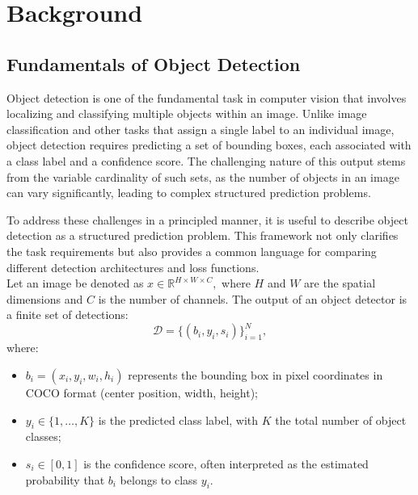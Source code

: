 \chapter{Background}
\label{ch:object-detection}
\section{Fundamentals of Object Detection}

Object detection is one of the fundamental task in computer vision that involves localizing and classifying multiple objects within an image. Unlike image classification and other tasks that assign a single label to an individual image, object detection requires predicting a set of bounding boxes, each associated with a class label and a confidence score. The challenging nature of this output stems from the variable cardinality of such sets, as the number of objects in an image can vary significantly, leading to complex structured prediction problems.

To address these challenges in a principled manner, it is useful to describe object detection as a structured prediction problem. This framework not only clarifies the task requirements but also provides a common language for comparing different detection architectures and loss functions.\\

Let an image be denoted as 
$
x \in \mathbb{R}^{H \times W \times C},
$
where $H$ and $W$ are the spatial dimensions and $C$ is the number of channels.
The output of an object detector is a finite set of detections:
$$
\mathcal{D} = \{ (b_i, y_i, s_i) \}_{i=1}^N,
$$
where:
\begin{itemize}
    \item $b_i = (x_i, y_i, w_i, h_i)$ represents the bounding box in pixel coordinates in COCO format (center position, width, height);
    \item $y_i \in \{1, \dots, K\}$ is the predicted class label, with $K$ the total number of object classes;
    \item $s_i \in [0,1]$ is the confidence score, often interpreted as the estimated probability that $b_i$ belongs to class $y_i$.
\end{itemize}

